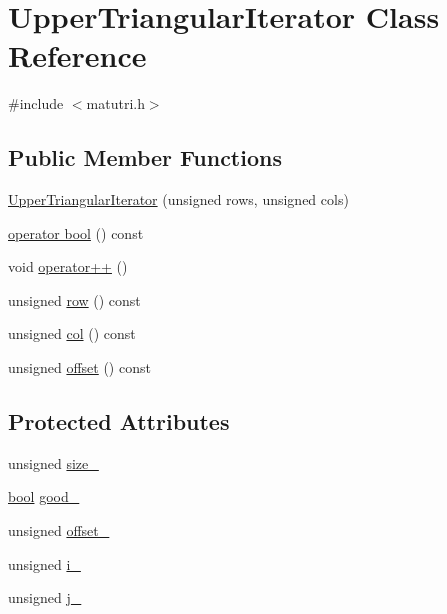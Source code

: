 \hypertarget{classUpperTriangularIterator}{}\section{Upper\+Triangular\+Iterator Class Reference}
\label{classUpperTriangularIterator}


{\ttfamily \#include $<$matutri.\+h$>$}

\subsection*{Public Member Functions}
\begin{DoxyCompactItemize}
\item 
\hyperlink{classUpperTriangularIterator_ac0b821b6876d40c4e46a85292fe779a2}{Upper\+Triangular\+Iterator} (unsigned rows, unsigned cols)
\item 
\hyperlink{classUpperTriangularIterator_a481cfad92336d968428da320ba8fd7d6}{operator bool} () const 
\item 
void \hyperlink{classUpperTriangularIterator_a9ed10a8f70b2efac6da0269915ae3cfc}{operator++} ()
\item 
unsigned \hyperlink{classUpperTriangularIterator_afe1782495437b70acbf7b2d60e7cfcfb}{row} () const 
\item 
unsigned \hyperlink{classUpperTriangularIterator_aea5cf5bd74d12bd13f2ebad79183d660}{col} () const 
\item 
unsigned \hyperlink{classUpperTriangularIterator_a9f47ed58b3a94c6d21aa13d8c6b45016}{offset} () const 
\end{DoxyCompactItemize}
\subsection*{Protected Attributes}
\begin{DoxyCompactItemize}
\item 
unsigned \hyperlink{classUpperTriangularIterator_a0c6e58c284e4e65c2017666da3831573}{size\+\_\+}
\item 
\hyperlink{compiler_8h_abb452686968e48b67397da5f97445f5b}{bool} \hyperlink{classUpperTriangularIterator_ad01ffa6b1c60402626db7cf9860c8b84}{good\+\_\+}
\item 
unsigned \hyperlink{classUpperTriangularIterator_aad40a6efac16e56d13eb124907965dd4}{offset\+\_\+}
\item 
unsigned \hyperlink{classUpperTriangularIterator_aa6a266d1e02ed93ddee18a143822415a}{i\+\_\+}
\item 
unsigned \hyperlink{classUpperTriangularIterator_a6f784b1be08d73ff791a1fe0a84286ff}{j\+\_\+}
\end{DoxyCompactItemize}


